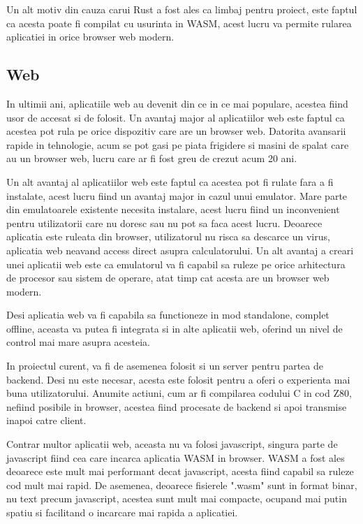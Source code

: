 \documentclass[titlepage,12pt]{article}
\begin{document}
Un alt motiv din cauza carui \ac {Rust} a fost ales ca limbaj pentru proiect, este faptul ca acesta poate fi compilat cu usurinta in \ac {WASM},
acest lucru va permite rularea aplicatiei in orice browser web modern.

\subsection{Web}

In ultimii ani, aplicatiile web au devenit din ce in ce mai populare, acestea fiind usor de accesat si de folosit.
Un avantaj major al aplicatiilor web este faptul ca acestea pot rula pe orice dispozitiv care are un browser web.
Datorita avansarii rapide in tehnologie, acum se pot gasi pe piata frigidere si masini de spalat care au un browser web, lucru care ar fi fost greu de crezut acum 20 ani.

Un alt avantaj al aplicatiilor web este faptul ca acestea pot fi rulate fara a fi instalate, acest lucru fiind un avantaj major in cazul unui emulator.
Mare parte din emulatoarele existente necesita instalare, acest lucru fiind un inconvenient pentru utilizatorii care nu doresc sau nu pot sa faca acest lucru.
Deoarece aplicatia este ruleata din browser, utilizatorul nu risca sa descarce un virus, aplicatia web neavand access direct asupra calculatorului.
Un alt avantaj a creari unei aplicatii web este ca emulatorul va fi capabil sa ruleze pe orice arhitectura de procesor sau sistem de operare, atat timp cat acesta are un browser web modern.

Desi aplicatia web va fi capabila sa functioneze in mod standalone, complet offline, aceasta va putea fi integrata si in alte aplicatii web, oferind un nivel de control mai mare asupra acesteia.

In proiectul curent, va fi de asemenea folosit si un server pentru partea de backend. Desi nu este necesar, acesta este folosit pentru a oferi o experienta mai buna utilizatorului.
Anumite actiuni, cum ar fi compilarea codului C in cod Z80, nefiind posibile in browser, acestea fiind procesate de backend si apoi transmise inapoi catre client.

Contrar multor aplicatii web, aceasta nu va folosi javascript, singura parte de javascript fiind cea care incarca aplicatia \ac {WASM} in browser.
\ac {WASM} a fost ales deoarece este mult mai performant decat javascript, acesta fiind capabil sa ruleze cod mult mai rapid. De asemenea, deoarece fisierele ".wasm" sunt in format binar,
nu text precum javascript, acestea sunt mult mai compacte, ocupand mai putin spatiu si facilitand o incarcare mai rapida a aplicatiei.
\end{document}
